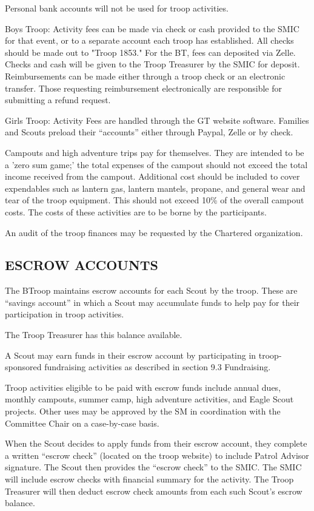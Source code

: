 \documentclass{ltxguide}
\begin{document}
Personal bank accounts will not be used for troop activities.

Boys Troop: Activity fees can be made via check or cash provided to the SMIC for that event, or to a separate account each troop has established. All checks should be made out to "Troop 1853." For the BT, fees can deposited via Zelle.  Checks and cash will be given to the Troop Treasurer by the SMIC for deposit. Reimbursements can be made either through a troop check or an electronic transfer. Those requesting reimbursement electronically are responsible for submitting a refund request.

Girls Troop: Activity Fees are handled through the GT website software. Families and Scouts preload their “accounts” either through Paypal, Zelle or by check. 

Campouts and high adventure trips pay for themselves. They are intended to be a 'zero sum game;' the total expenses of the campout should not exceed the total income received from the campout. Additional cost should be included to cover expendables such as lantern gas, lantern mantels, propane, and general wear and tear of the troop equipment. This should not exceed 10\% of the overall campout costs. The costs of these activities are to be borne by the participants.

An audit of the troop finances may be requested by the Chartered organization.

\subsection{ESCROW ACCOUNTS}
The BTroop maintains escrow accounts for each Scout by the troop. These are “savings account” in which a Scout may accumulate funds to help pay for their participation in troop activities.

The Troop Treasurer has this balance available.

A Scout may earn funds in their escrow account by participating in troop-sponsored fundraising activities as described in section 9.3 Fundraising.

Troop activities eligible to be paid with escrow funds include annual dues, monthly campouts, summer camp, high adventure activities, and Eagle Scout projects. Other uses may be approved by the \ac{SM} in coordination with the Committee Chair on a case-by-case basis.

When the Scout decides to apply funds from their escrow account, they complete a written “escrow check” (located on the troop website) to include Patrol Advisor signature. The Scout then provides the “escrow check” to the SMIC. The SMIC will include escrow checks with financial summary for the activity. The Troop Treasurer will then deduct escrow check amounts from each such Scout's escrow balance.
\end{document}
